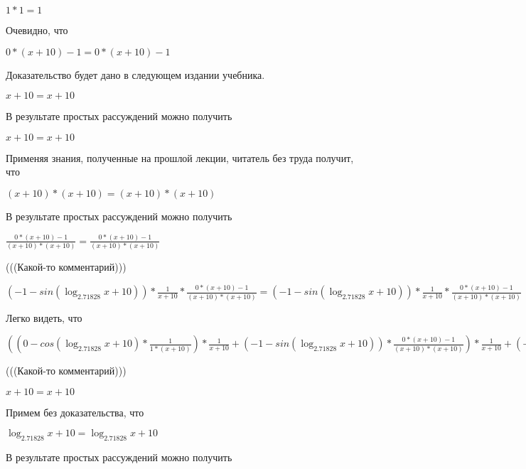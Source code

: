 \documentclass[12pt,a4paper,fleqn]{article}
\theoremstyle{definition}
\begin{document}
$ 1  *  1  =  1 $

Очевидно, что 

$ 0  * ( x  +  10 ) -  1  =  0  * ( x  +  10 ) -  1 $

Доказательство будет дано в следующем издании учебника. 

$ x  +  10  =  x  +  10 $

В результате простых рассуждений можно получить 

$ x  +  10  =  x  +  10 $

Применяя знания, полученные на прошлой лекции, читатель без труда получит, что 

$( x  +  10 ) * ( x  +  10 ) = ( x  +  10 ) * ( x  +  10 )$

В результате простых рассуждений можно получить 

$\frac{ 0  * ( x  +  10 ) -  1 }{( x  +  10 ) * ( x  +  10 )}
 = \frac{ 0  * ( x  +  10 ) -  1 }{( x  +  10 ) * ( x  +  10 )}
$

(((Какой-то комментарий))) 

$( -1  - sin(\log_{ 2.71828 }{ x  +  10 })) * \frac{ 1 }{ x  +  10 }
 * \frac{ 0  * ( x  +  10 ) -  1 }{( x  +  10 ) * ( x  +  10 )}
 = ( -1  - sin(\log_{ 2.71828 }{ x  +  10 })) * \frac{ 1 }{ x  +  10 }
 * \frac{ 0  * ( x  +  10 ) -  1 }{( x  +  10 ) * ( x  +  10 )}
$

Легко видеть, что 

$(( 0  - cos(\log_{ 2.71828 }{ x  +  10 }) * \frac{ 1 }{ 1  * ( x  +  10 )}
) * \frac{ 1 }{ x  +  10 }
 + ( -1  - sin(\log_{ 2.71828 }{ x  +  10 })) * \frac{ 0  * ( x  +  10 ) -  1 }{( x  +  10 ) * ( x  +  10 )}
) * \frac{ 1 }{ x  +  10 }
 + ( -1  - sin(\log_{ 2.71828 }{ x  +  10 })) * \frac{ 1 }{ x  +  10 }
 * \frac{ 0  * ( x  +  10 ) -  1 }{( x  +  10 ) * ( x  +  10 )}
 = (( 0  - cos(\log_{ 2.71828 }{ x  +  10 }) * \frac{ 1 }{ 1  * ( x  +  10 )}
) * \frac{ 1 }{ x  +  10 }
 + ( -1  - sin(\log_{ 2.71828 }{ x  +  10 })) * \frac{ 0  * ( x  +  10 ) -  1 }{( x  +  10 ) * ( x  +  10 )}
) * \frac{ 1 }{ x  +  10 }
 + ( -1  - sin(\log_{ 2.71828 }{ x  +  10 })) * \frac{ 1 }{ x  +  10 }
 * \frac{ 0  * ( x  +  10 ) -  1 }{( x  +  10 ) * ( x  +  10 )}
$

(((Какой-то комментарий))) 

$ x  +  10  =  x  +  10 $

Примем без доказательства, что 

$\log_{ 2.71828 }{ x  +  10 } = \log_{ 2.71828 }{ x  +  10 }$

В результате простых рассуждений можно получить 
\end{document}
